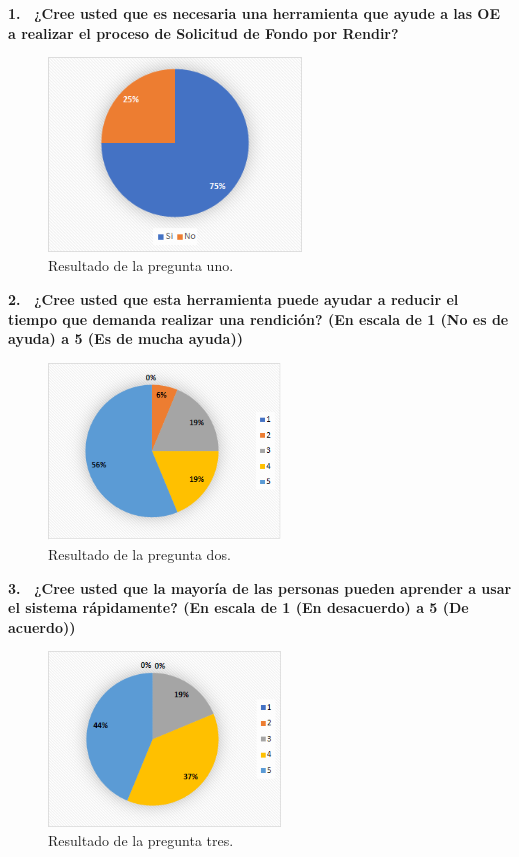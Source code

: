 \textbf{1.  ¿Cree usted que es necesaria una herramienta que ayude a las OE a realizar el proceso de Solicitud de Fondo por Rendir?}

    \begin{figure}[h!]
        \centering
        \includegraphics[width=0.6\textwidth]{Imagenes/Pregunta1.png}
        \caption{\label{fig: Pregunta1}Resultado de la pregunta uno.}
    \end{figure}
\newpage
\textbf{2.  ¿Cree usted que esta herramienta puede ayudar a reducir el tiempo que demanda realizar una rendición? (En escala de 1 (No es de ayuda) a 5 (Es de mucha ayuda))}

\begin{figure}[h!]
    \centering
    \includegraphics[width=0.55\textwidth]{Imagenes/Pregunta2.png}
    \caption{\label{fig: Pregunta2}Resultado de la pregunta dos.}
\end{figure}

\textbf{3.  ¿Cree usted que la mayoría de las personas pueden aprender a usar el sistema rápidamente? (En escala de 1 (En desacuerdo) a 5 (De acuerdo))}

\begin{figure}[h!]
    \centering
    \includegraphics[width=0.55\textwidth]{Imagenes/Pregunta3.png}
    \caption{\label{fig: Pregunta3}Resultado de la pregunta tres.}
\end{figure}

